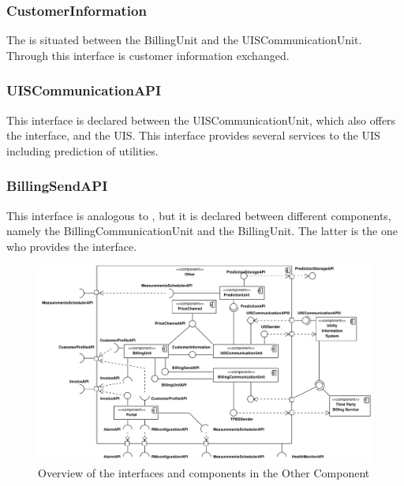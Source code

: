 \subsubsection{CustomerInformation}

\npar The  is situated between the BillingUnit
and the UISCommunicationUnit. Through this interface is customer information
exchanged.

\subsubsection{UISCommunicationAPI}

\npar This interface is declared between the UISCommunicationUnit, which
also offers the interface, and the UIS. This interface provides several services
to the UIS including prediction of utilities.

\subsubsection{BillingSendAPI}

\npar This interface is analogous to , but it
is declared between different components, namely the BillingCommunicationUnit
and the BillingUnit. The latter is the one who provides the interface.

\begin{figure}[H]
	\begin{centering}
		\includegraphics[width=\textwidth]{figs/add-it10-interfaces.pdf}
		\caption{Overview of the interfaces and components in the Other Component}
		\label{fig:it10/interfaces}
	\end{centering}
\end{figure}


